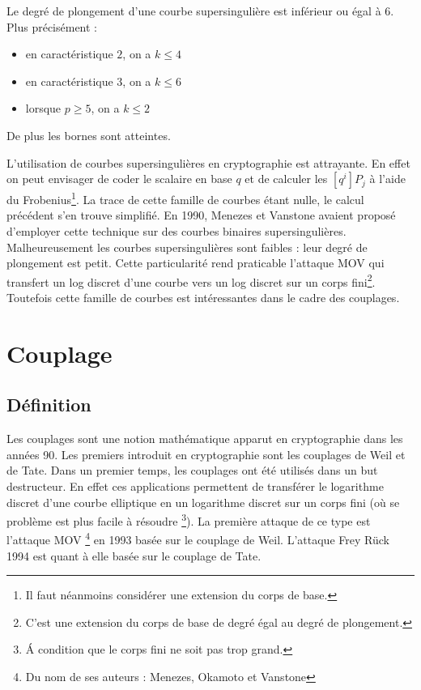 
\begin{theoreme}
Le degré de plongement d'une courbe supersingulière est inférieur ou égal à $6$. Plus précisément :
\begin{itemize}[label=$\bullet$]
    \item en caractéristique $2$, on a $k \leq 4$
    \item en caractéristique $3$, on a $k \leq 6$
    \item lorsque $p \geq 5$, on a $k \leq 2$
\end{itemize}
De plus les bornes sont atteintes.
\end{theoreme}

L'utilisation de courbes supersingulières en cryptographie est attrayante. En effet on peut envisager de coder le scalaire en base $q$ et de calculer les $[q^i]P_j$ à l'aide du Frobenius\footnote{Il faut néanmoins considérer une extension du corps de base.}. La trace de cette famille de courbes étant nulle, le calcul précédent s'en trouve simplifié. En 1990, Menezes et Vanstone avaient proposé d'employer cette technique sur des courbes binaires supersingulières.
Malheureusement les courbes supersingulières sont faibles : leur degré de plongement est petit. Cette particularité rend praticable l'attaque MOV qui transfert un log discret d'une courbe vers un log discret sur un corps fini\footnote{C'est une extension du corps de base de degré égal au degré de plongement.}. Toutefois cette famille de courbes est intéressantes dans le cadre des couplages.



\section{Couplage}
\subsection{Définition}
Les couplages sont une notion mathématique apparut en cryptographie dans les années 90. Les premiers introduit en cryptographie sont les couplages de Weil et de Tate. Dans un premier temps, les couplages ont été utilisés dans un but destructeur. En effet ces applications permettent de transférer le logarithme discret d'une courbe elliptique en un logarithme discret sur un corps fini (où se problème est plus facile à résoudre \footnote{\'{A} condition que le corps fini ne soit pas trop grand.}). La première attaque de ce type est l'attaque MOV \footnote{Du nom de ses auteurs : Menezes, Okamoto et Vanstone} en 1993 basée sur le couplage de Weil. L'attaque Frey Rück 1994 est quant à elle basée sur le couplage de Tate. 

